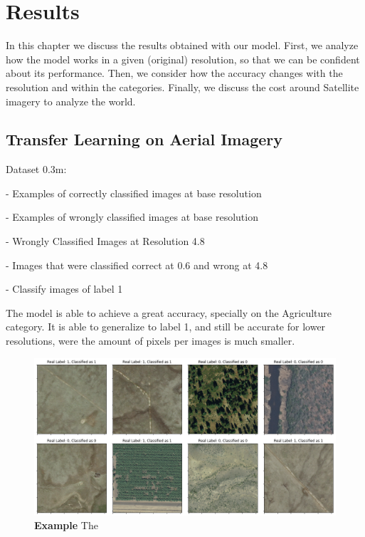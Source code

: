 
\chapter{Results} 

\label{Chapter5}


In this chapter we discuss the results obtained with our model. First, we analyze how the model works in a given (original) resolution, so that we can be confident about its performance. Then, we consider how the accuracy changes with the resolution and within the categories. Finally, we discuss the cost around Satellite imagery to analyze the world. 

\section{Transfer Learning on Aerial Imagery}

Dataset 0.3m:

- Examples of correctly classified images at base resolution

- Examples of wrongly classified images at base resolution

- Wrongly Classified Images at Resolution 4.8

- Images that were classified correct at 0.6 and wrong at 4.8

- Classify images of label 1

The model is able to achieve a great accuracy, specially on the Agriculture category. It is able to generalize to label 1, and still be accurate for lower resolutions, were the amount of pixels per images is much smaller.

\begin{figure}[h!]
	\centering
	\captionsetup{width=1\linewidth}
	\includegraphics[width=1\textwidth]{Figures/results/class_dataset03m_res03_correct.png}
	\caption{\textbf{Example} The }
	\label{fig:dataset03m_res03_correct}
\end{figure}

